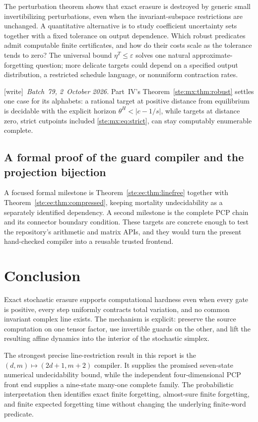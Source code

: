 \documentclass[11pt,letterpaper]{article}
\theoremstyle{definition}
\theoremstyle{remark}
\newcommand{\wtag}{\textup{[write]}}
\begin{document}
The perturbation theorem shows that exact erasure is destroyed by generic small
invertibilizing perturbations, even when the invariant-subspace restrictions
are unchanged. A quantitative alternative is to study coefficient uncertainty
sets together with a fixed tolerance on output dependence. Which robust
predicates admit computable finite certificates, and how do their costs scale
as the tolerance tends to zero? The universal bound
$\eta^T\leq\varepsilon$ solves one natural approximate-forgetting question;
more delicate targets could depend on a specified output distribution, a
restricted schedule language, or nonuniform contraction rates.

\wtag\ \emph{Batch~79, 2~October 2026.} Part~IV's Theorem~\ref{ste:mx:thm:robust} settles one case for its alphabets: a rational target at positive distance from equilibrium is decidable with the explicit horizon $\theta^H<|c-1/s|$, while targets at distance zero, strict cutpoints included \eqref{ste:mx:eq:strict}, can stay computably enumerable complete.

\subsection{A formal proof of the guard compiler and the projection bijection}\label{ste:ee:q:formal}

A focused formal milestone is Theorem~\ref{ste:ee:thm:linefree} together with
Theorem~\ref{ste:ee:thm:compressed}, keeping mortality undecidability as a separately
identified dependency. A second milestone is the complete PCP chain and its
connector boundary condition. These targets are concrete enough to test the
repository's arithmetic and matrix APIs, and they would turn the present
hand-checked compiler into a reusable trusted frontend.

\section{Conclusion}

Exact stochastic erasure supports computational hardness even when every gate
is positive, every step uniformly contracts total variation, and no common
invariant complex line exists. The mechanism is explicit: preserve the source
computation on one tensor factor, use invertible guards on the other, and lift
the resulting affine dynamics into the interior of the stochastic simplex.

The strongest precise line-restriction result in this report is the
$(d,m)\mapsto(2d+1,m+2)$ compiler. It supplies the promised seven-state numerical
undecidability bound, while the independent four-dimensional PCP front end
supplies a nine-state many-one complete family. The probabilistic interpretation
then identifies exact finite forgetting, almost-sure finite forgetting, and
finite expected forgetting time without changing the underlying finite-word
predicate.
\end{document}
